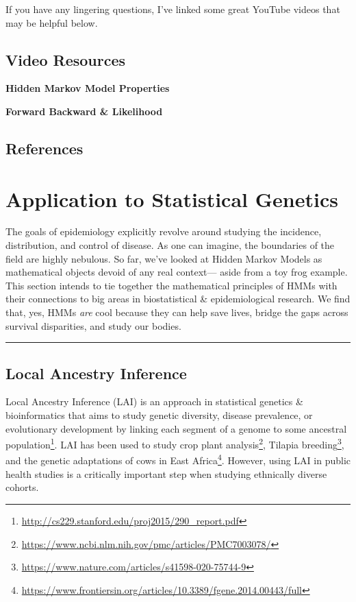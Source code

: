\documentclass[
]{book}
\begin{document}
If you have any lingering questions, I've linked some great YouTube videos that may be helpful below.

\hypertarget{video-resources-1}{%
\section*{Video Resources}\label{video-resources-1}}

\textbf{Hidden Markov Model Properties}

\textbf{Forward Backward \& Likelihood}

\hfill\break

\hypertarget{references-1}{%
\section*{References}\label{references-1}}

\hypertarget{application-to-statistical-genetics}{%
\chapter{Application to Statistical Genetics}\label{application-to-statistical-genetics}}

The goals of epidemiology explicitly revolve around studying the incidence, distribution, and control of disease. As one can imagine, the boundaries of the field are highly nebulous. So far, we've looked at Hidden Markov Models as mathematical objects devoid of any real context--- aside from a toy frog example. This section intends to tie together the mathematical principles of HMMs with their connections to big areas in biostatistical \& epidemiological research. We find that, yes, HMMs \emph{are} cool because they can help save lives, bridge the gaps across survival disparities, and study our bodies.

\hfill\break

\begin{center}\rule{0.5\linewidth}{0.5pt}\end{center}

\hypertarget{local-ancestry-inference}{%
\section{Local Ancestry Inference}\label{local-ancestry-inference}}

Local Ancestry Inference (LAI) is an approach in statistical genetics \& bioinformatics that aims to study genetic diversity, disease prevalence, or evolutionary development by linking each segment of a genome to some ancestral population\footnote{\url{http://cs229.stanford.edu/proj2015/290_report.pdf}}. LAI has been used to study crop plant analysis\footnote{\url{https://www.ncbi.nlm.nih.gov/pmc/articles/PMC7003078/}}, Tilapia breeding\footnote{\url{https://www.nature.com/articles/s41598-020-75744-9}}, and the genetic adaptations of cows in East Africa\footnote{\url{https://www.frontiersin.org/articles/10.3389/fgene.2014.00443/full}}. However, using LAI in public health studies is a critically important step when studying ethnically diverse cohorts.
\end{document}
